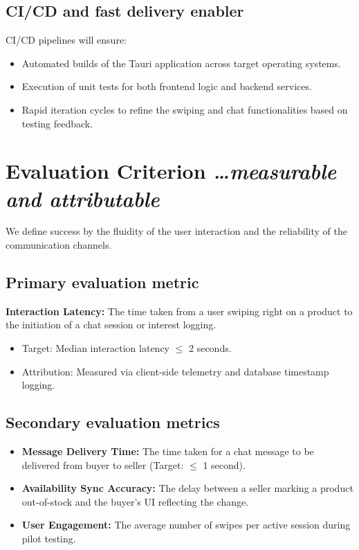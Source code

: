 \documentclass[11pt,a4paper]{article}
\newcommand{\BvrHint}[1]{%
  {\normalfont\normalsize\itshape\hfill #1}}
\begin{document}
\subsection{CI/CD and fast delivery enabler}
CI/CD pipelines will ensure:
\begin{itemize}[leftmargin=0.7cm]
    \item Automated builds of the Tauri application across target operating systems.
    \item Execution of unit tests for both frontend logic and backend services.
    \item Rapid iteration cycles to refine the swiping and chat functionalities based on testing feedback.
\end{itemize}

\section{Evaluation Criterion %
\BvrHint{\ldots measurable and attributable}}
We define success by the fluidity of the user interaction and the reliability of the communication channels.

\subsection{Primary evaluation metric}
\textbf{Interaction Latency:} The time taken from a user swiping right on a product to the initiation of a chat session or interest logging.
\begin{itemize}[leftmargin=0.7cm]
    \item Target: Median interaction latency $\le$ 2 seconds.
    \item Attribution: Measured via client-side telemetry and database timestamp logging.
\end{itemize}

\subsection{Secondary evaluation metrics}
\begin{itemize}[leftmargin=0.7cm]
    \item \textbf{Message Delivery Time:} The time taken for a chat message to be delivered from buyer to seller (Target: $\le$ 1 second).
    \item \textbf{Availability Sync Accuracy:} The delay between a seller marking a product out-of-stock and the buyer's UI reflecting the change.
    \item \textbf{User Engagement:} The average number of swipes per active session during pilot testing.
\end{itemize}
\end{document}

